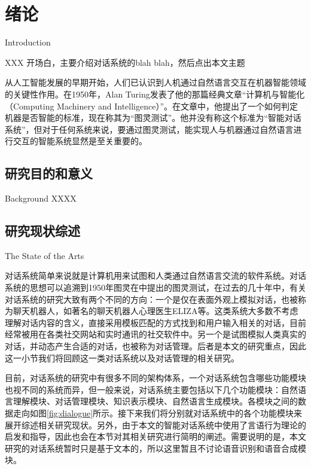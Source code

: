 \chapter{绪论}{Introduction}
\label{chap:intro}


XXX 开场白，主要介绍对话系统的blah blah，然后点出本文主题

      从人工智能发展的早期开始，人们已认识到人机通过自然语言交互在机器智能领域的关键性作用。在1950年，Alan Turing发表了他的那篇经典文章“计算机与智能化（Computing  Machinery and Intelligence）”。在文章中，他提出了一个如何判定机器是否智能的标准，现在称其为“图灵测试”。他并没有称这个标准为“智能对话系统”，但对于任何系统来说，要通过图灵测试，能实现人与机器通过自然语言进行交互的智能系统显然是至关重要的。

\section{研究目的和意义}{Background}
XXXX

\section{研究现状综述}{The State of the Arts}
\label{sec:review}

对话系统简单来说就是计算机用来试图和人类通过自然语言交流的软件系统。对话系统的思想可以追溯到1950年图灵在\cite{Turing1950}中提出的图灵测试，在过去的几十年中，有关对话系统的研究大致有两个不同的方向：一个是仅在表面外观上模拟对话，也被称为聊天机器人，如著名的聊天机器人心理医生ELIZA\cite{Weizenbaum1966}等。这类系统大多数不考虑理解对话内容的含义，直接采用模板匹配的方式找到和用户输入相关的对话，目前经常被用在各类社交网站和实时通讯的社交软件中。另一个是试图模拟人类真实的对话，并动态产生合适的对话，也被称为对话管理。后者是本文的研究重点，因此这一小节我们将回顾这一类对话系统以及对话管理的相关研究。

目前，对话系统的研究中有很多不同的架构体系，一个对话系统包含哪些功能模块也视不同的系统而异，但一般来说，对话系统主要包括以下几个功能模块：自然语言理解模块、对话管理模块、知识表示模块、自然语言生成模块\cite{Arora2013}。各模块之间的数据走向如图\ref{fig:dialogue}所示。接下来我们将分别就对话系统中的各个功能模块来展开综述相关研究现状。另外，由于本文的智能对话系统中使用了言语行为理论的启发和指导，因此也会在本节对其相关研究进行简明的阐述。需要说明的是，本文研究的对话系统暂时只是基于文本的，所以这里暂且不讨论语音识别和语音合成模块。

